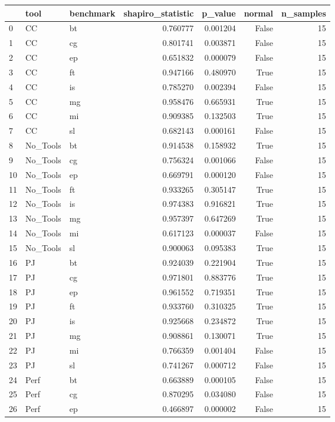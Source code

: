 \begin{tabular}{lllrrrr}
\toprule
 & tool & benchmark & shapiro_statistic & p_value & normal & n_samples \\
\midrule
0 & CC & bt & 0.760777 & 0.001204 & False & 15 \\
1 & CC & cg & 0.801741 & 0.003871 & False & 15 \\
2 & CC & ep & 0.651832 & 0.000079 & False & 15 \\
3 & CC & ft & 0.947166 & 0.480970 & True & 15 \\
4 & CC & is & 0.785270 & 0.002394 & False & 15 \\
5 & CC & mg & 0.958476 & 0.665931 & True & 15 \\
6 & CC & mi & 0.909385 & 0.132503 & True & 15 \\
7 & CC & sl & 0.682143 & 0.000161 & False & 15 \\
8 & No_Tools & bt & 0.914538 & 0.158932 & True & 15 \\
9 & No_Tools & cg & 0.756324 & 0.001066 & False & 15 \\
10 & No_Tools & ep & 0.669791 & 0.000120 & False & 15 \\
11 & No_Tools & ft & 0.933265 & 0.305147 & True & 15 \\
12 & No_Tools & is & 0.974383 & 0.916821 & True & 15 \\
13 & No_Tools & mg & 0.957397 & 0.647269 & True & 15 \\
14 & No_Tools & mi & 0.617123 & 0.000037 & False & 15 \\
15 & No_Tools & sl & 0.900063 & 0.095383 & True & 15 \\
16 & PJ & bt & 0.924039 & 0.221904 & True & 15 \\
17 & PJ & cg & 0.971801 & 0.883776 & True & 15 \\
18 & PJ & ep & 0.961552 & 0.719351 & True & 15 \\
19 & PJ & ft & 0.933760 & 0.310325 & True & 15 \\
20 & PJ & is & 0.925668 & 0.234872 & True & 15 \\
21 & PJ & mg & 0.908861 & 0.130071 & True & 15 \\
22 & PJ & mi & 0.766359 & 0.001404 & False & 15 \\
23 & PJ & sl & 0.741267 & 0.000712 & False & 15 \\
24 & Perf & bt & 0.663889 & 0.000105 & False & 15 \\
25 & Perf & cg & 0.870295 & 0.034080 & False & 15 \\
26 & Perf & ep & 0.466897 & 0.000002 & False & 15 \\

\end{tabular}
